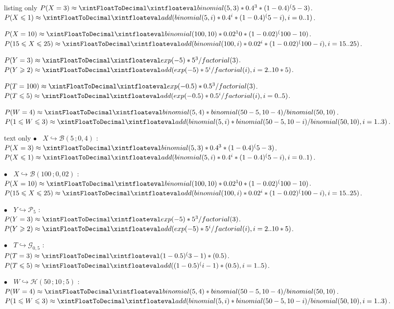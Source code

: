 \documentclass[a4paper,french,11pt]{article}
\begin{document}
\begin{PresCodeTexPL}{listing only}
$P(X=3) \approx \CalcBinomP{5}{0.4}{3}$.
$P(X\leqslant1) \approx \CalcBinomC{5}{0.4}{*}{1}$.

$P(X=10) \approx \CalcBinomP{100}{0.02}{10}$.
$P(15\leqslant X\leqslant25) \approx \CalcBinomC{100}{0.02}{15}{25}$.

$P(Y=3) \approx \CalcPoissP{5}{3}$.
$P(Y\geqslant2) \approx \CalcPoissC{5}{2}{*}$.

$P(T=100) \approx \CalcPoissP{0.5}{3}$.
$P(T\leqslant5) \approx \CalcPoissC{0.5}{*}{5}$.

$P(W=4) \approx \CalcHypergeomP{50}{10}{5}{4}$.
$P(1\leqslant W\leqslant3) \approx \CalcHypergeomC{50}{10}{5}{1}{3}$.
\end{PresCodeTexPL}

\begin{PresCodeSortiePL}{text only}
$\bullet~~~~X \hookrightarrow \mathcal{B}(5\,; 0,4)$ :\\
$P(X=3) \approx \CalcBinomP{5}{0.4}{3}$.\\
$P(X\leqslant1) \approx \CalcBinomC{5}{0.4}{*}{1}$.

\medskip

$\bullet~~~~X \hookrightarrow \mathcal{B}(100\,; 0,02)$ :\\
$P(X=10) \approx \CalcBinomP{100}{0.02}{10}$.\\
$P(15\leqslant X\leqslant25) \approx \CalcBinomC{100}{0.02}{15}{25}$.

\medskip

$\bullet~~~~Y \hookrightarrow \mathcal{P}_5$ :\\
$P(Y=3) \approx \CalcPoissP{5}{3}$.\\
$P(Y\geqslant2) \approx \CalcPoissC{5}{2}{*}$.

\medskip

$\bullet~~~~T \hookrightarrow \mathcal{G}_{0,5}$ :\\
$P(T=3) \approx \CalcGeomP{0.5}{3}$.\\
$P(T\leqslant5) \approx \CalcGeomC{0.5}{*}{5}$.

\medskip

$\bullet~~~~W \hookrightarrow \mathcal{H}(50\,; 10\,; 5)$ :\\
$P(W=4) \approx \CalcHypergeomP{50}{10}{5}{4}$.\\
$P(1\leqslant W\leqslant3) \approx \CalcHypergeomC{50}{10}{5}{1}{3}$.
\end{PresCodeSortiePL}
\end{document}
